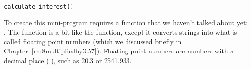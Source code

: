 \begin{Verbatim}[frame=single]
calculate_interest()
\end{Verbatim}

\noindent
To create this mini-program requires a function that we haven't talked about yet: . The  function is a bit like the  function, except it converts strings into what is called floating point numbers (which we discussed briefly in Chapter~\ref{ch:8multipliedby3.57}).  Floating point numbers are numbers with a decimal place (.), such as 20.3 or 2541.933.

\newpage
